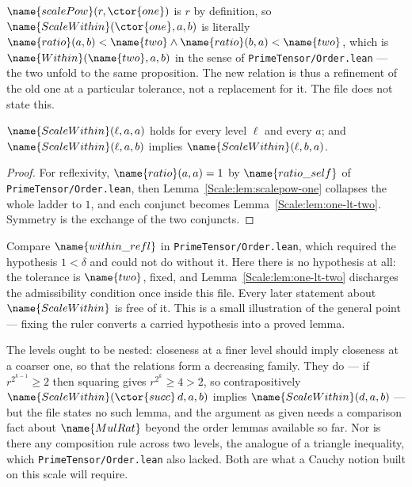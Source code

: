 \begin{remark}\label{Scale:rem:level-one}
$\name{scalePow}(r, \ctor{one})$ is $r$ by definition, so
$\name{ScaleWithin}(\ctor{one}, a, b)$ is literally
$\name{ratio}(a,b) < \name{two} \wedge \name{ratio}(b,a) < \name{two}$, which
is $\name{Within}(\name{two}, a, b)$ in the sense of
\texttt{PrimeTensor/Order.lean} --- the two unfold to the same proposition.
The new relation is thus a refinement of the old one at a particular
tolerance, not a replacement for it.  The file does not state this.
\end{remark}

\begin{lemma}
\label{Scale:lem:refl-symm}
$\name{ScaleWithin}(\ell, a, a)$ holds for every level $\ell$ and every $a$;
and $\name{ScaleWithin}(\ell, a, b)$ implies $\name{ScaleWithin}(\ell, b, a)$.
\end{lemma}

\begin{proof}
For reflexivity, $\name{ratio}(a,a) = 1$ by $\name{ratio\_self}$ of
\texttt{PrimeTensor/Order.lean}, then
Lemma~\ref{Scale:lem:scalepow-one} collapses the whole ladder to $1$, and each
conjunct becomes Lemma~\ref{Scale:lem:one-lt-two}.  Symmetry is the exchange of
the two conjuncts.
\end{proof}

\begin{remark}\label{Scale:rem:uncond}
Compare $\name{within\_refl}$ in \texttt{PrimeTensor/Order.lean}, which
required the hypothesis $1 < \delta$ and could not do without it.  Here there
is no hypothesis at all: the tolerance is $\name{two}$, fixed, and
Lemma~\ref{Scale:lem:one-lt-two} discharges the admissibility condition once
inside this file.  Every later statement about $\name{ScaleWithin}$ is free of
it.  This is a small illustration of the general point --- fixing the ruler
converts a carried hypothesis into a proved lemma.
\end{remark}

\begin{remark}\label{Scale:rem:mono}
The levels ought to be nested: closeness at a finer level should imply
closeness at a coarser one, so that the relations form a decreasing family.
They do --- if $r^{2^{k-1}} \geq 2$ then squaring gives $r^{2^{k}} \geq 4 > 2$,
so contrapositively $\name{ScaleWithin}(\ctor{succ}\,d, a, b)$ implies
$\name{ScaleWithin}(d, a, b)$ --- but the file states no such lemma, and the
argument as given needs a comparison fact about $\name{MulRat}$ beyond the
order lemmas available so far.  Nor is there any composition rule across two
levels, the analogue of a triangle inequality, which
\texttt{PrimeTensor/Order.lean} also lacked.  Both are what a Cauchy notion
built on this scale will require.
\end{remark}


